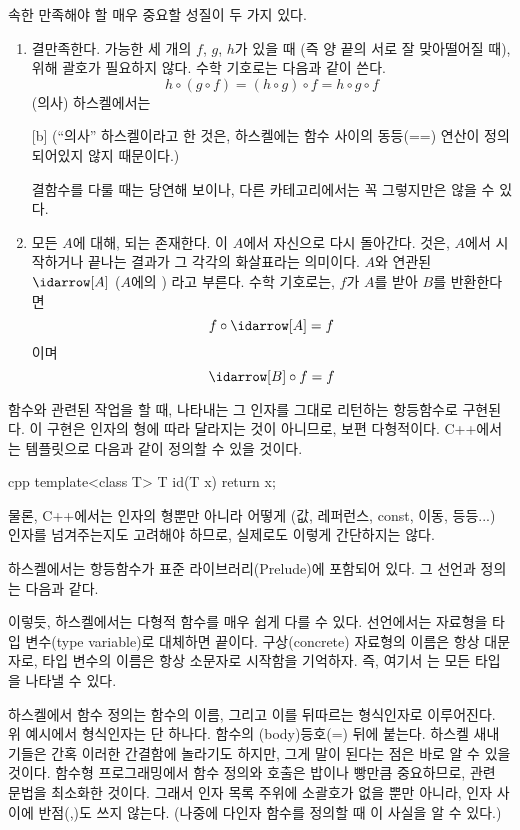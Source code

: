  속한  만족해야 할 매우 중요할 성질이 두 가지 있다.

\begin{enumerate}
\item
{} 결 만족한다. \trComposition 가능한 세 개의 \trMorphism $f$, $g$, $h$가 있을 때
(즉 양 끝의  서로 잘 맞아떨어질 때),  위해 괄호가 필요하지 않다.
수학 기호로는 다음과 같이 쓴다.
\[h \circ (g \circ f) = (h \circ g) \circ f = h \circ g \circ f\]
(의사) 하스켈에서는

[b]
(``의사'' 하스켈이라고 한 것은, 하스켈에는 함수 사이의 동등(==) 연산이 정의되어있지 않지 때문이다.)

결 함수를 다룰 때는 당연해 보이나, 다른 카테고리에서는 꼭 그렇지만은 않을 수 있다.

\item
모든 \trObject $A$에 대해,   되는  존재한다.
이  $A$에서 자신으로 다시 돌아간다. 
  것은, $A$에서 시작하거나 끝나는   결과가 그 각각의 화살표라는 의미이다.
\trObject $A$와 연관된 \trUnit {} $\idarrow[A]$ ($A$에의 \newterm{\trIdentity}) 라고 부른다.
수학 기호로는, $f$가 $A$를 받아 $B$를 반환한다면
\[f \circ \idarrow[A] = f\]
이며
\[\idarrow[B] \circ f = f\]
\end{enumerate}
함수와 관련된 작업을 할 때, \trIdentity\을 나타내는 \trArrow\는 그 인자를 그대로 리턴하는 항등함수로 구현된다.
이 구현은 인자의 형에 따라 달라지는 것이 아니므로, 보편 다형적이다. 
C++에서는 템플릿으로 다음과 같이 정의할 수 있을 것이다.

\begin{snip}{cpp}
template<class T> T id(T x) { return x; }
\end{snip}
물론, C++에서는 인자의 형뿐만 아니라 어떻게 (값, 레퍼런스, const, 이동, 등등...) 인자를 넘겨주는지도 고려해야 하므로,
실제로도 이렇게 간단하지는 않다.

하스켈에서는 항등함수가 표준 라이브러리(Prelude)에 포함되어 있다. 
그 선언과 정의는 다음과 같다.

이렇듯, 하스켈에서는 다형적 함수를 매우 쉽게 다를 수 있다.
선언에서는 자료형을 타입 변수(type variable)로 대체하면 끝이다.
구상(concrete) 자료형의 이름은 항상 대문자로, 타입 변수의 이름은 항상 소문자로 시작함을 기억하자.
즉, 여기서 는 모든 타입을 나타낼 수 있다.

하스켈에서 함수 정의는 함수의 이름, 그리고 이를 뒤따르는 형식인자로 이루어진다.
위 예시에서 형식인자는  단 하나다.
함수의 \trFunctionBody(body)\는 등호(=) 뒤에 붙는다.
하스켈 새내기들은 간혹 이러한 간결함에 놀라기도 하지만, 그게 말이 된다는 점은 바로 알 수 있을 것이다.
함수형 프로그래밍에서 함수 정의와 호출은 밥이나 빵만큼 중요하므로, 관련 문법을 최소화한 것이다.
그래서 인자 목록 주위에 소괄호가 없을 뿐만 아니라, 인자 사이에 반점(,)도 쓰지 않는다.
(나중에 다인자 함수를 정의할 때 이 사실을 알 수 있다.)

